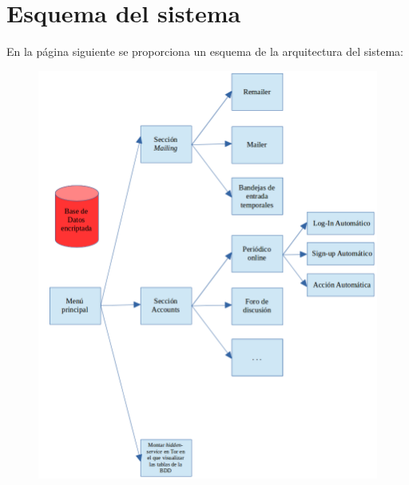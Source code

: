 \chapter{Esquema del sistema}
\label{Anexo:esquema}

En la página siguiente se proporciona un esquema de la arquitectura del sistema:
\begin{figure}
	\centerline{
		\mbox{\includegraphics[width=8.00in]{images/esquema.png}}
	}
	\label{fig:norm_Daugman}
\end{figure}


\newpage \thispagestyle{empty} %